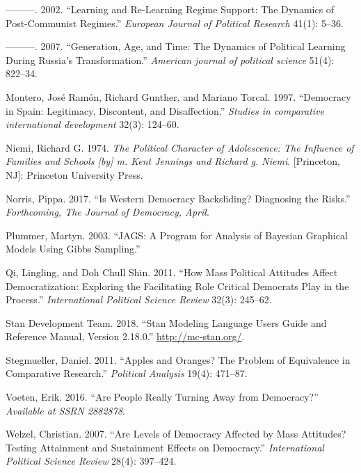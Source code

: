 \documentclass[12pt,english,a4paper,oneside]{article}
\newlength{\cslhangindent}
\newlength{\cslentryspacingunit} %
\newenvironment{CSLReferences}[2] %
 {%
  \setlength{\parindent}{0pt}
  \ifodd #1
  \let\oldpar\par
  \def\par{\hangindent=\cslhangindent\oldpar}
  \fi
  \setlength{\parskip}{#2\cslentryspacingunit}
 }%
 {}
\theoremstyle{definition}
\theoremstyle{definition}
\theoremstyle{definition}
\theoremstyle{definition}
\theoremstyle{remark}
\begin{document}
\begin{CSLReferences}{1}{0}
\leavevmode{}%
---------. 2002. {``Learning and Re-Learning Regime Support: The Dynamics of Post-Communist Regimes.''} \emph{European Journal of Political Research} 41(1): 5--36.

\leavevmode{}%
---------. 2007. {``Generation, Age, and Time: The Dynamics of Political Learning During Russia's Transformation.''} \emph{American journal of political science} 51(4): 822--34.

\leavevmode{}%
Montero, José Ramón, Richard Gunther, and Mariano Torcal. 1997. {``Democracy in Spain: Legitimacy, Discontent, and Disaffection.''} \emph{Studies in comparative international development} 32(3): 124--60.

\leavevmode{}%
Niemi, Richard G. 1974. \emph{The Political Character of Adolescence: The Influence of Families and Schools {[}by{]} m. Kent Jennings and Richard g. Niemi}. {[}Princeton, NJ{]}: Princeton University Press.

\leavevmode{}%
Norris, Pippa. 2017. {``Is Western Democracy Backsliding? Diagnosing the Risks.''} \emph{Forthcoming, The Journal of Democracy, April}.

\leavevmode{}%
Plummer, Martyn. 2003. {``JAGS: A Program for Analysis of Bayesian Graphical Models Using Gibbs Sampling.''}

\leavevmode{}%
Qi, Lingling, and Doh Chull Shin. 2011. {``How Mass Political Attitudes Affect Democratization: Exploring the Facilitating Role Critical Democrats Play in the Process.''} \emph{International Political Science Review} 32(3): 245--62.

\leavevmode{}%
Stan Development Team. 2018. {``Stan Modeling Language Users Guide and Reference Manual, Version 2.18.0.''} \url{http://mc-stan.org/}.

\leavevmode{}%
Stegmueller, Daniel. 2011. {``Apples and Oranges? The Problem of Equivalence in Comparative Research.''} \emph{Political Analysis} 19(4): 471--87.

\leavevmode{}%
Voeten, Erik. 2016. {``Are People Really Turning Away from Democracy?''} \emph{Available at SSRN 2882878}.

\leavevmode{}%
Welzel, Christian. 2007. {``Are Levels of Democracy Affected by Mass Attitudes? Testing Attainment and Sustainment Effects on Democracy.''} \emph{International Political Science Review} 28(4): 397--424.


\end{CSLReferences}
\end{document}
